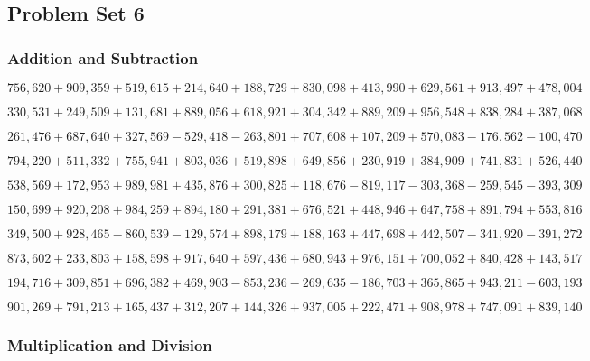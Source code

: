 \hypertarget{problem-set-6-5}{%
\subsection{Problem Set 6}\label{problem-set-6-5}}

\hypertarget{addition-and-subtraction-311}{%
\subsubsection{Addition and
Subtraction}\label{addition-and-subtraction-311}}

\(756,620+909,359+519,615+214,640+188,729+830,098+413,990+629,561+913,497+ 478,004\)

\(330,531+249,509+131,681+889,056+618,921+304,342+889,209+956,548+838,284+387,068\)

\(261,476+687,640+327,569-529,418-263,801+707,608+107,209+570,083-176,562-100,470\)

\(794,220+511,332+755,941+803,036+519,898+649,856+230,919+384,909+741,831+526,440\)

\(538,569+172,953+989,981+435,876+300,825+118,676-819,117-303,368-259,545-393,309\)

\(150,699+920,208+984,259+894,180+291,381+676,521+448,946+647,758+891,794+553,816\)

\(349,500+928,465-860,539-129,574+898,179+188,163+447,698+442,507-341,920-391,272\)

\(873,602+233,803+158,598+917,640+597,436+680,943+976,151+700,052+840,428+143,517\)

\(194,716+309,851+696,382+469,903-853,236-269,635-186,703+365,865+943,211-603,193\)

\(901,269+791,213+165,437+312,207+144,326+937,005+222,471+908,978+747,091+839,140\)

\hypertarget{multiplication-and-division-310}{%
\subsubsection{Multiplication and
Division}\label{multiplication-and-division-310}}

